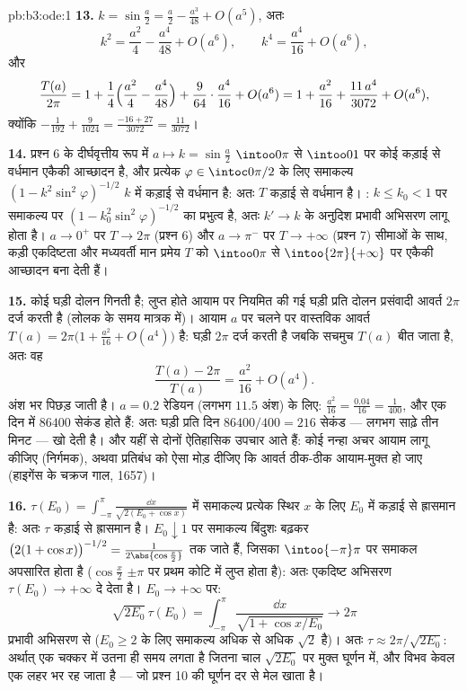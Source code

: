 \begin{solution}{pb:b3:ode:1}
\textbf{13.} $k = \sin\frac a2 = \frac a2 - \frac{a^3}{48} +
O(a^5)$, अतः
\[
k^2 = \frac{a^2}4 - \frac{a^4}{48} + O(a^6),
\qquad
k^4 = \frac{a^4}{16} + O(a^6) ,
\]
और
\[
\frac{T(a)}{2\pi} = 1 + \frac14\Bigl(\frac{a^2}4 -
\frac{a^4}{48}\Bigr) + \frac9{64}\cdot\frac{a^4}{16} +
O(a^6)
= 1 + \frac{a^2}{16} + \frac{11\,a^4}{3072} + O(a^6) ,
\]
क्योंकि $-\frac1{192} + \frac9{1024} = \frac{-16 + 27}{3072}
= \frac{11}{3072}$।

\textbf{14.} प्रश्न 6 के दीर्घवृत्तीय रूप में $a \mapsto
k = \sin\frac a2$ $\intoo0\pi$ से $\intoo01$
पर कोई  कड़ाई से वर्धमान एकैकी आच्छादन है, और प्रत्येक $\varphi \in \intoc0{\pi/2}$ के
लिए समाकल्य $(1 -
k^2\sin^2\varphi)^{-1/2}$ $k$ में कड़ाई से वर्धमान है: अतः $T$ कड़ाई से
वर्धमान है। : $k \leq k_0 < 1$ पर समाकल्य पर  $(1 -
k_0^2\sin^2\varphi)^{-1/2}$ का प्रभुत्व है,
अतः $k' \to k$ के अनुदिश प्रभावी अभिसरण लागू होता है। $a
\to 0^+$ पर $T \to 2\pi$
(प्रश्न 6) और $a \to \pi^-$ पर $T \to +\infty$ (प्रश्न 7) सीमाओं के साथ, कड़ी एकदिष्टता
और मध्यवर्ती मान प्रमेय $T$ को $\intoo0\pi$ से $\intoo{2\pi}{+\infty}$ पर एकैकी आच्छादन बना
देती हैं।

\textbf{15.} कोई घड़ी दोलन गिनती है; लुप्त होते आयाम पर नियमित की
गई घड़ी प्रति दोलन प्रसंवादी आवर्त $2\pi$ दर्ज करती है (लोलक के समय
मात्रक में)। आयाम $a$ पर चलने पर वास्तविक आवर्त $T(a) = 2\pi\bigl(1 + \frac{a^2}{16} +
O(a^4)\bigr)$ है: घड़ी
$2\pi$ दर्ज करती है जबकि सचमुच $T(a)$ बीत जाता है, अतः वह
\[
\frac{T(a) - 2\pi}{T(a)} = \frac{a^2}{16} + O(a^4) .
\]
अंश भर पिछड़ जाती है। $a = 0.2$ रेडियन (लगभग $11.5$ अंश) के लिए: $\frac{a^2}{16} =
\frac{0.04}{16} = \frac1{400}$,
और एक दिन में $86400$ सेकंड होते हैं: अतः घड़ी प्रति दिन $86400/400 = 216$ सेकंड
--- लगभग साढ़े तीन मिनट --- खो देती है। और यहीं से दोनों ऐतिहासिक
उपचार आते हैं: कोई नन्हा अचर आयाम लागू कीजिए (निर्गमक), अथवा प्रतिबंध
को ऐसा मोड़ दीजिए कि आवर्त ठीक-ठीक आयाम-मुक्त हो जाए (हाइगेंस के
चक्रज गाल, 1657)।

\textbf{16.} $\tau(E_0) = \int_{-\pi}^{\pi}\frac{\dd
x}{\sqrt{2(E_0 + \cos x)}}$ में समाकल्य प्रत्येक स्थिर $x$ के लिए $E_0$ में
कड़ाई से ह्रासमान है: अतः $\tau$ कड़ाई से ह्रासमान है। $E_0 \downarrow 1$ पर समाकल्य
बिंदुशः बढ़कर $\bigl(2(1 + \cos x)\bigr)^{-1/2} =
\frac1{2\abs{\cos\frac x2}}$ तक जाते हैं, जिसका $\intoo{-\pi}\pi$ पर समाकल अपसारित होता
है ($\cos\frac x2$ $\pm\pi$ पर प्रथम कोटि में लुप्त होता है): अतः एकदिष्ट अभिसरण
$\tau(E_0)
\to +\infty$ दे देता है। $E_0 \to +\infty$ पर:
\[
\sqrt{2E_0}\,\tau(E_0) = \int_{-\pi}^{\pi}
\frac{\dd x}{\sqrt{1 + \cos x/E_0}} \longrightarrow 2\pi
\]
प्रभावी अभिसरण से ($E_0 \geq 2$ के लिए समाकल्य अधिक से अधिक $\sqrt2$ है)। अतः
$\tau \approx 2\pi/\sqrt{2E_0}$: अर्थात् एक चक्कर में उतना ही समय लगता है जितना चाल $\sqrt{2E_0}$ पर
मुक्त घूर्णन में, और विभव केवल एक लहर भर रह जाता है --- जो प्रश्न
10 की घूर्णन दर से मेल खाता है।


\end{solution}
